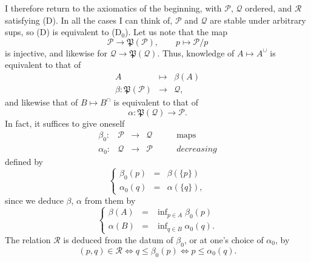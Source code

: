 \documentclass[11pt]{article}
\newcommand{\printedpage}[1]{\marginpar{\footnotesize p.~#1}}
\newcommand{\msp}[1]{\marginpar{\footnotesize [#1]}}
\newcommand{\cP}{\mathcal{P}}
\newcommand{\cQ}{\mathcal{Q}}
\newcommand{\cR}{\mathcal{R}}
\newcommand{\fP}{\mathfrak{P}}
\begin{document}
I therefore return to the axiomatics of the beginning, with $\cP$, $\cQ$ ordered, and $\cR$ satisfying (D). In all the cases I can think of, $\cP$ and $\cQ$ are stable under arbitrary sups, so (D) is equivalent to (D$_0$). Let us note that the map
\[
\cP \longrightarrow \fP(\cP), \qquad p \longmapsto \cP/p
\]
is injective, and likewise for $\cQ \longrightarrow \fP(\cQ)$. Thus, knowledge of $A \longmapsto A^{\cup}$ is equivalent to that of %
\[
\begin{array}{rcl}
A & \longmapsto & \beta(A)\\[0.5ex]
\beta : \fP(\cP) & \longrightarrow & \cQ,
\end{array}
\]
and likewise that of $B \longmapsto B^{\cap}$ is equivalent to
\msp{75}
that of
\[
\alpha : \fP(\cQ) \longrightarrow \cP.
\]
In fact, it suffices to give oneself
\[
\begin{array}{rcccl}
\beta_0 : & \cP & \longrightarrow & \cQ & \qquad \text{maps}\\
\alpha_0 : & \cQ & \longrightarrow & \cP & \qquad \textit{decreasing}
\end{array}
\tag*{(5.15)}
\]
defined by
\[
\left\{
\begin{array}{rcl}
\beta_0(p) & = & \beta(\{p\})\\[1ex]
\alpha_0(q) & = & \alpha(\{q\}),
\end{array}
\right.
\]
since we deduce $\beta$, $\alpha$ from them by
\[
\left\{
\begin{array}{rcl}
\beta(A) & = & \inf\nolimits_{p \in A} \beta_0(p)\\[1ex]
\alpha(B) & = & \inf\nolimits_{q \in B} \alpha_0(q).
\end{array}
\right.
\tag*{(5.16)}
\]
The relation $\cR$ is deduced from the datum of $\beta_0$, or at one's choice of $\alpha_0$, by
\[
(p,q) \in \cR \iff q \leq \beta_0(p) \iff p \leq \alpha_0(q).
\tag*{(5.17)}
\]

\printedpage{47}
\end{document}
